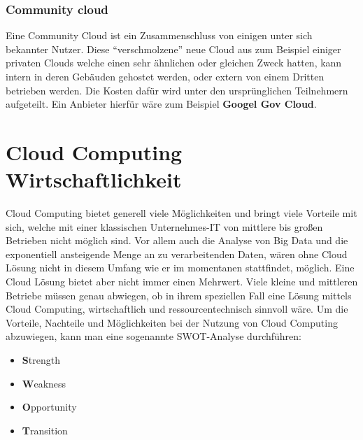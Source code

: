 \subsubsection{Community cloud}
Eine Community Cloud ist ein Zusammenschluss von einigen unter sich bekannter Nutzer. Diese "`verschmolzene"' neue Cloud aus zum Beispiel einiger privaten Clouds welche einen sehr ähnlichen oder gleichen Zweck hatten, kann intern in deren Gebäuden gehostet werden, oder extern von einem Dritten betrieben werden. Die Kosten dafür wird unter den ursprünglichen Teilnehmern aufgeteilt.
Ein Anbieter hierfür wäre zum Beispiel \textbf{Googel Gov Cloud}.

\section{Cloud Computing Wirtschaftlichkeit}
Cloud Computing bietet generell viele Möglichkeiten und bringt viele Vorteile mit sich, welche mit einer klassischen Unternehmes-IT von mittlere bis großen Betrieben nicht möglich sind. Vor allem auch die Analyse von Big Data und die exponentiell ansteigende Menge an zu verarbeitenden Daten, wären ohne Cloud Lösung nicht in diesem Umfang wie er im momentanen stattfindet, möglich.
Eine Cloud Lösung bietet aber nicht immer einen Mehrwert. Viele kleine und mittleren Betriebe müssen genau abwiegen, ob in ihrem speziellen Fall eine Lösung mittels Cloud Computing, wirtschaftlich und ressourcentechnisch sinnvoll wäre.
Um die Vorteile, Nachteile und Möglichkeiten bei der Nutzung von Cloud Computing abzuwiegen, kann man eine sogenannte SWOT-Analyse
durchführen:
\begin{itemize}
	\item \textbf{S}trength
	\item \textbf{W}eakness
	\item \textbf{O}pportunity
	\item \textbf{T}ransition
\end{itemize}

